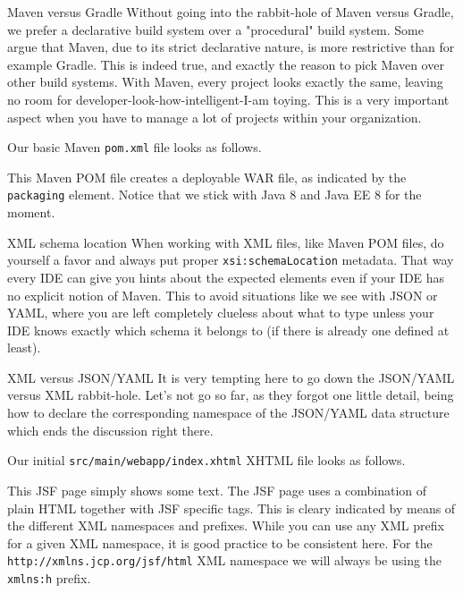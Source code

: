 \begin{ClownComputing}{Maven versus Gradle}
	Without going into the rabbit-hole of Maven versus Gradle, we prefer a declarative build system over a "procedural" build system.
	Some argue that Maven, due to its strict declarative nature, is more restrictive than for example Gradle.
	This is indeed true, and exactly the reason to pick Maven over other build systems.
	With Maven, every project looks exactly the same, leaving no room for developer-look-how-intelligent-I-am toying.
	This is a very important aspect when you have to manage a lot of projects within your organization.
\end{ClownComputing}

Our basic Maven \cite{ApacheMaven} \texttt{pom.xml} file looks as follows.

This Maven POM file creates a deployable WAR file, as indicated by the \texttt{packaging} element.
Notice that we stick with Java 8 \cite{GoslingJoyEtAl14} and Java EE 8 \cite{JavaEE8} for the moment.

\begin{TIP}{XML schema location}
	When working with XML files, like Maven POM files, do yourself a favor and always put proper \texttt{xsi:schemaLocation} metadata.
	That way every IDE can give you hints about the expected elements even if your IDE has no explicit notion of Maven.
	This to avoid situations like we see with JSON or YAML, where you are left completely clueless about what to type unless your IDE knows exactly which schema it belongs to (if there is already one defined at least).
\end{TIP}

\begin{ClownComputing}{XML versus JSON/YAML}
	It is very tempting here to go down the JSON/YAML versus XML rabbit-hole.
	Let's not go so far, as they forgot one little detail, being how to declare the corresponding namespace of the JSON/YAML data structure which ends the discussion right there.
\end{ClownComputing}

Our initial \texttt{src/main/webapp/index.xhtml} XHTML file looks as follows.

This JSF page simply shows some text.
The JSF  page uses a combination of plain HTML together with JSF specific tags.
This is cleary indicated by means of the different XML namespaces and prefixes.
While you can use any XML prefix for a given XML namespace, it is good practice to be consistent here.
For the \texttt{http://xmlns.jcp.org/jsf/html} XML namespace we will always be using the \texttt{xmlns:h} prefix.

